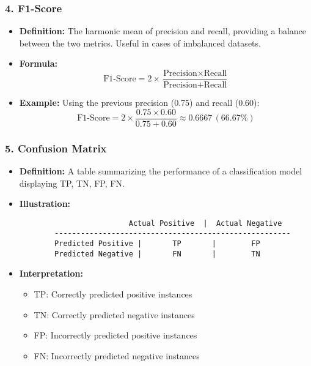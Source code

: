 \documentclass[aspectratio=169]{beamer}
\begin{document}
\begin{frame}[fragile]
    \frametitle{4. F1-Score}
    \begin{itemize}
        \item \textbf{Definition:} The harmonic mean of precision and recall, providing a balance between the two metrics. Useful in cases of imbalanced datasets.
        \item \textbf{Formula:}  
        \begin{equation}
            \text{F1-Score} = 2 \times \frac{\text{Precision} \times \text{Recall}}{\text{Precision} + \text{Recall}}
        \end{equation}
        \item \textbf{Example:} Using the previous precision (0.75) and recall (0.60):
        \begin{equation}
            \text{F1-Score} = 2 \times \frac{0.75 \times 0.60}{0.75 + 0.60} \approx 0.6667 \, (66.67\%)
        \end{equation}
    \end{itemize}
\end{frame}

\begin{frame}[fragile]
    \frametitle{5. Confusion Matrix}
    \begin{itemize}
        \item \textbf{Definition:} A table summarizing the performance of a classification model displaying TP, TN, FP, FN.
        \item \textbf{Illustration:}
        \begin{verbatim}
                         Actual Positive  |  Actual Negative
        ------------------------------------------------------
        Predicted Positive |       TP       |        FP
        Predicted Negative |       FN       |        TN
        \end{verbatim}
        \item \textbf{Interpretation:} 
        \begin{itemize}
            \item TP: Correctly predicted positive instances
            \item TN: Correctly predicted negative instances
            \item FP: Incorrectly predicted positive instances
            \item FN: Incorrectly predicted negative instances
        \end{itemize}
    \end{itemize}
\end{frame}
\end{document}
